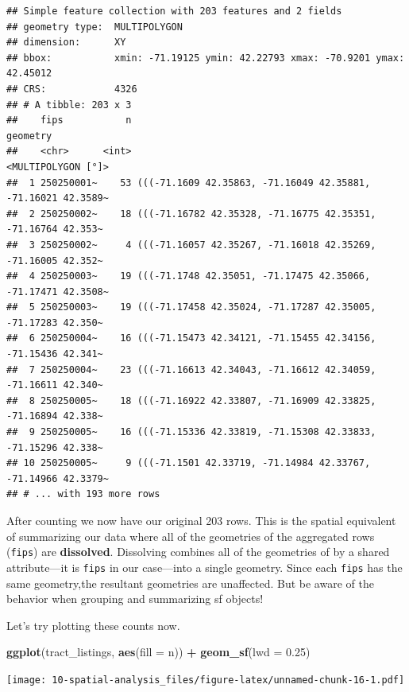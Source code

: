 \documentclass[
]{book}
\newenvironment{Shaded}{\begin{snugshade}}{\end{snugshade}}
\newcommand{\DataTypeTok}[1]{\textcolor[rgb]{0.13,0.29,0.53}{#1}}
\newcommand{\FloatTok}[1]{\textcolor[rgb]{0.00,0.00,0.81}{#1}}
\newcommand{\KeywordTok}[1]{\textcolor[rgb]{0.13,0.29,0.53}{\textbf{#1}}}
\newcommand{\NormalTok}[1]{#1}
\newcommand{\OperatorTok}[1]{\textcolor[rgb]{0.81,0.36,0.00}{\textbf{#1}}}
\newcommand{\StringTok}[1]{\textcolor[rgb]{0.31,0.60,0.02}{#1}}
\begin{document}
\begin{verbatim}
## Simple feature collection with 203 features and 2 fields
## geometry type:  MULTIPOLYGON
## dimension:      XY
## bbox:           xmin: -71.19125 ymin: 42.22793 xmax: -70.9201 ymax: 42.45012
## CRS:            4326
## # A tibble: 203 x 3
##    fips           n                                                     geometry
##    <chr>      <int>                                           <MULTIPOLYGON [°]>
##  1 250250001~    53 (((-71.1609 42.35863, -71.16049 42.35881, -71.16021 42.3589~
##  2 250250002~    18 (((-71.16782 42.35328, -71.16775 42.35351, -71.16764 42.353~
##  3 250250002~     4 (((-71.16057 42.35267, -71.16018 42.35269, -71.16005 42.352~
##  4 250250003~    19 (((-71.1748 42.35051, -71.17475 42.35066, -71.17471 42.3508~
##  5 250250003~    19 (((-71.17458 42.35024, -71.17287 42.35005, -71.17283 42.350~
##  6 250250004~    16 (((-71.15473 42.34121, -71.15455 42.34156, -71.15436 42.341~
##  7 250250004~    23 (((-71.16613 42.34043, -71.16612 42.34059, -71.16611 42.340~
##  8 250250005~    18 (((-71.16922 42.33807, -71.16909 42.33825, -71.16894 42.338~
##  9 250250005~    16 (((-71.15336 42.33819, -71.15308 42.33833, -71.15296 42.338~
## 10 250250005~     9 (((-71.1501 42.33719, -71.14984 42.33767, -71.14966 42.3379~
## # ... with 193 more rows
\end{verbatim}

After counting we now have our original 203 rows. This is the spatial equivalent of summarizing our data where all of the geometries of the aggregated rows (\texttt{fips}) are \textbf{dissolved}. Dissolving combines all of the geometries of by a shared attribute---it is \texttt{fips} in our case---into a single geometry. Since each \texttt{fips} has the same geometry,the resultant geometries are unaffected. But be aware of the behavior when grouping and summarizing sf objects!

Let's try plotting these counts now.

\begin{Shaded}
\begin{Highlighting}[]
\KeywordTok{ggplot}\NormalTok{(tract\_listings, }\KeywordTok{aes}\NormalTok{(}\DataTypeTok{fill =}\NormalTok{ n)) }\OperatorTok{+}
\StringTok{  }\KeywordTok{geom\_sf}\NormalTok{(}\DataTypeTok{lwd =} \FloatTok{0.25}\NormalTok{)}
\end{Highlighting}
\end{Shaded}

\texttt{[image: 10-spatial-analysis\_files/figure-latex/unnamed-chunk-16-1.pdf]}
\end{document}
